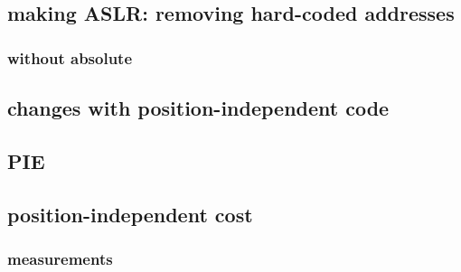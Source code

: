 \subsection{making ASLR: removing hard-coded addresses}


\subsubsection{without absolute}


\subsection{changes with position-independent code}


\subsection{PIE}


\subsection{position-independent cost}


\subsubsection{measurements}

